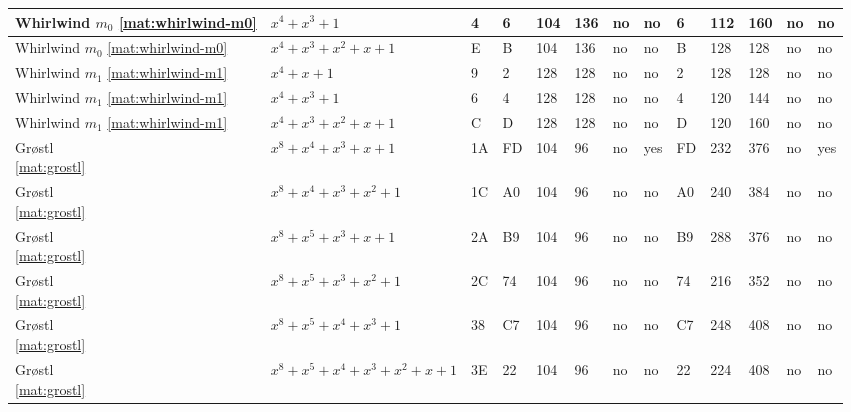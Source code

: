 \begin{tiny}
\begin{longtable}{|l|l|l|l|l|l|l|l|l|l|l|l|l|}
\shortstack{Whirlwind \\ $m_0$ \\ \eqref{mat:whirlwind-m0}} & $x^4 + x^3 + 1$ & 4 & 6 & 104 & 136 & no & no & 6 & 112 & 160 & no & no \\ \hline
\shortstack{Whirlwind \\ $m_0$ \\ \eqref{mat:whirlwind-m0}} & $x^4 + x^3 + x^2 + x + 1$ & E & B & 104 & 136 & no & no & B & 128 & 128 & no & no \\ \hline
\shortstack{Whirlwind \\ $m_1$ \\ \eqref{mat:whirlwind-m1}} & $x^4 + x + 1$ & 9 & 2 & 128 & 128 & no & no & 2 & 128 & 128 & no & no \\ \hline
\shortstack{Whirlwind \\ $m_1$ \\ \eqref{mat:whirlwind-m1}} & $x^4 + x^3 + 1$ & 6 & 4 & 128 & 128 & no & no & 4 & 120 & 144 & no & no \\ \hline
\shortstack{Whirlwind \\ $m_1$ \\ \eqref{mat:whirlwind-m1}} & $x^4 + x^3 + x^2 + x + 1$ & C & D & 128 & 128 & no & no & D & 120 & 160 & no & no \\ \hline
\shortstack{Gr{\o}stl \\ \eqref{mat:grostl}} & $x^8 + x^4 + x^3 + x + 1$ & 1A & FD & 104 & 96 & no & yes & FD & 232 & 376 & no & yes \\ \hline
\shortstack{Gr{\o}stl \\ \eqref{mat:grostl}} & $x^8 + x^4 + x^3 + x^2 + 1$ & 1C & A0 & 104 & 96 & no & no & A0 & 240 & 384 & no & no \\ \hline
\shortstack{Gr{\o}stl \\ \eqref{mat:grostl}} & $x^8 + x^5 + x^3 + x + 1$ & 2A & B9 & 104 & 96 & no & no & B9 & 288 & 376 & no & no \\ \hline
\shortstack{Gr{\o}stl \\ \eqref{mat:grostl}} & $x^8 + x^5 + x^3 + x^2 + 1$ & 2C & 74 & 104 & 96 & no & no & 74 & 216 & 352 & no & no \\ \hline
\shortstack{Gr{\o}stl \\ \eqref{mat:grostl}} & $x^8 + x^5 + x^4 + x^3 + 1$ & 38 & C7 & 104 & 96 & no & no & C7 & 248 & 408 & no & no \\ \hline
\shortstack{Gr{\o}stl \\ \eqref{mat:grostl}} & $x^8 + x^5 + x^4 + x^3 + x^2 + x + 1$ & 3E & 22 & 104 & 96 & no & no & 22 & 224 & 408 & no & no \\ \hline

\end{longtable}
\end{tiny}
